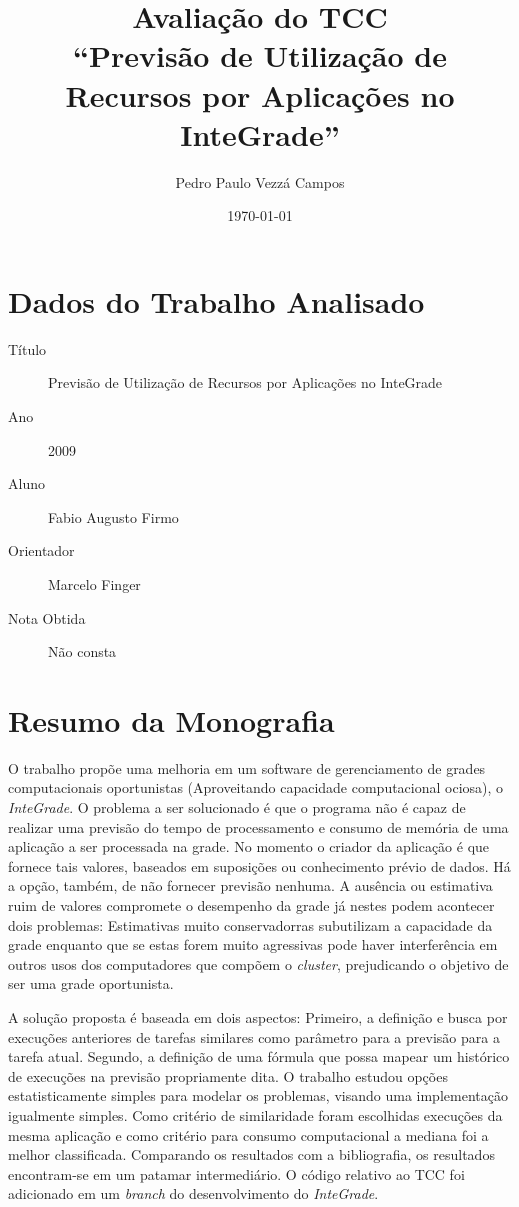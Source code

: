 \documentclass[brazil]{article}
\begin{document}
\author{Pedro Paulo Vezzá Campos}
\title{Avaliação do TCC \\ ``Previsão de Utilização de Recursos por Aplicações no InteGrade''}
\date{\today}
\maketitle

\section{Dados do Trabalho Analisado}
	\begin{description}
		\item[Título] Previsão de Utilização de Recursos por Aplicações no InteGrade
		\item[Ano] 2009
		\item[Aluno] Fabio Augusto Firmo
		\item[Orientador] Marcelo Finger
		\item[Nota Obtida] Não consta
	\end{description}

\section{Resumo da Monografia}
	O trabalho propõe uma melhoria em um software de gerenciamento de grades computacionais oportunistas (Aproveitando capacidade computacional ociosa), o \emph{InteGrade}. O problema a ser solucionado é que o programa não é capaz de realizar uma previsão do tempo de processamento e consumo de memória de uma aplicação a ser processada na grade. No momento o criador da aplicação é que fornece tais valores, baseados em suposições ou conhecimento prévio de dados. Há a opção, também, de não fornecer previsão nenhuma. A ausência ou estimativa ruim de valores compromete o desempenho da grade já nestes podem acontecer dois problemas: Estimativas muito conservadorras subutilizam a capacidade da grade enquanto que se estas forem muito agressivas pode haver interferência em outros usos dos computadores que compõem o \emph{cluster}, prejudicando o objetivo de ser uma grade oportunista.

	A solução proposta é baseada em dois aspectos: Primeiro, a definição e busca por execuções anteriores de tarefas similares como parâmetro para a previsão para a tarefa atual. Segundo, a definição de uma fórmula que possa mapear um histórico de execuções na previsão propriamente dita. O trabalho estudou opções estatisticamente simples para modelar os problemas, visando uma implementação igualmente simples. Como critério de similaridade foram escolhidas execuções da mesma aplicação e como critério para consumo computacional a mediana foi a melhor classificada. Comparando os resultados com a bibliografia, os resultados encontram-se em um patamar intermediário. O código relativo ao TCC foi adicionado em um \emph{branch} do desenvolvimento do \emph{InteGrade}.
	
\end{document}
